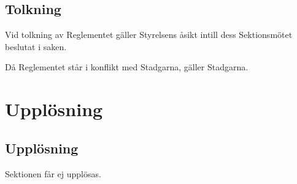 \documentclass[10pt]{article}
\begin{document}
\subsection{Tolkning}
Vid tolkning av Reglementet gäller Styrelsens åsikt intill dess Sektionsmötet
beslutat i saken.

Då Reglementet står i konflikt med Stadgarna, gäller Stadgarna.
\newpage

\section{Upplösning}
\subsection{Upplösning}
Sektionen får ej upplösas.
\newpage
\end{document}
